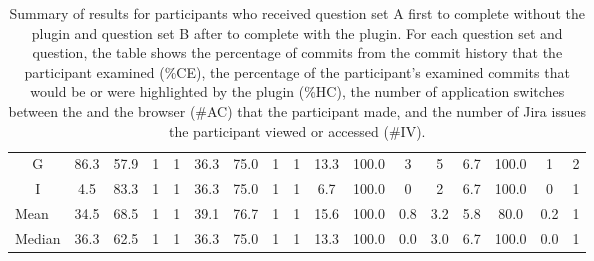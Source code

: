 \begin{landscape}
\begin{table}[p]
\begin{tabular}{@{}ccccccccccccccccc@{}}
    \multicolumn{1}{c|}{G}              & 86.3 & 57.9 & 1    & \multicolumn{1}{c|}{1}    & 36.3                     & 75.0                     & 1                        & \multicolumn{1}{c|}{1}    & 13.3 & 100.0                    & 3                        & \multicolumn{1}{c|}{5}    & 6.7                      & 100.0                    & 1                        & 2                        \\
    \multicolumn{1}{c|}{I}              & 4.5  & 83.3 & 1    & \multicolumn{1}{c|}{1}    & 36.3                     & 75.0                     & 1                        & \multicolumn{1}{c|}{1}    & 6.7  & 100.0                    & 0                        & \multicolumn{1}{c|}{2}    & 6.7                      & 100.0                    & 0                        & 1                        \\ \midrule
    \multicolumn{1}{l|}{Mean}           & 34.5 & 68.5 & 1    & \multicolumn{1}{c|}{1}    & 39.1                     & 76.7                     & 1                        & \multicolumn{1}{c|}{1}    & 15.6 & 100.0                    & 0.8                      & \multicolumn{1}{c|}{3.2}  & 5.8                      & 80.0                     & 0.2                      & 1                        \\
    \multicolumn{1}{l|}{Median}         & 36.3 & 62.5 & 1    & \multicolumn{1}{c|}{1}    & 36.3                     & 75.0                     & 1                        & \multicolumn{1}{c|}{1}    & 13.3 & 100.0                    & 0.0                      & \multicolumn{1}{c|}{3.0}  & 6.7                      & 100.0                    & 0.0                      & 1                        \\ \bottomrule
  \end{tabular}
  \caption{
    Summary of results for participants who received question set A first to complete without the plugin and question set B after to complete with the plugin.
    For each question set and question, the table shows the percentage of commits from the commit history that the participant examined (\%CE), 
    the percentage of the participant's examined commits that would be or were highlighted by the plugin (\%HC),
    the number of application switches between the  and the browser (\#AC) that the participant made,
    and the number of Jira issues the participant viewed or accessed (\#IV).
  }
  \label{tab:Results-Quantitative-AB}
\end{table}
\end{landscape}


